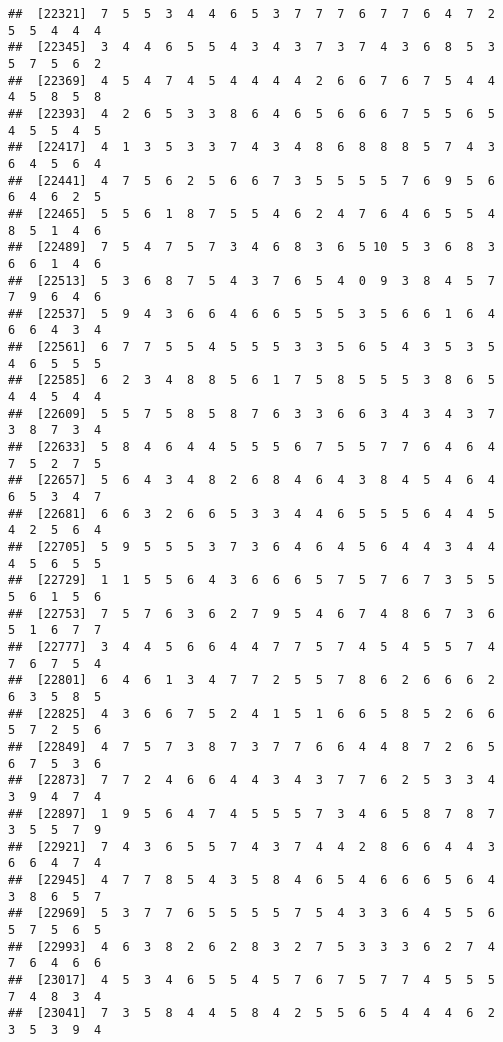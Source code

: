 \documentclass[
]{book}
\begin{document}
\begin{verbatim}
##  [22321]  7  5  5  3  4  4  6  5  3  7  7  7  6  7  7  6  4  7  2  5  5  4  4  4
##  [22345]  3  4  4  6  5  5  4  3  4  3  7  3  7  4  3  6  8  5  3  5  7  5  6  2
##  [22369]  4  5  4  7  4  5  4  4  4  4  2  6  6  7  6  7  5  4  4  4  5  8  5  8
##  [22393]  4  2  6  5  3  3  8  6  4  6  5  6  6  6  7  5  5  6  5  4  5  5  4  5
##  [22417]  4  1  3  5  3  3  7  4  3  4  8  6  8  8  8  5  7  4  3  6  4  5  6  4
##  [22441]  4  7  5  6  2  5  6  6  7  3  5  5  5  5  7  6  9  5  6  6  4  6  2  5
##  [22465]  5  5  6  1  8  7  5  5  4  6  2  4  7  6  4  6  5  5  4  8  5  1  4  6
##  [22489]  7  5  4  7  5  7  3  4  6  8  3  6  5 10  5  3  6  8  3  6  6  1  4  6
##  [22513]  5  3  6  8  7  5  4  3  7  6  5  4  0  9  3  8  4  5  7  7  9  6  4  6
##  [22537]  5  9  4  3  6  6  4  6  6  5  5  5  3  5  6  6  1  6  4  6  6  4  3  4
##  [22561]  6  7  7  5  5  4  5  5  5  3  3  5  6  5  4  3  5  3  5  4  6  5  5  5
##  [22585]  6  2  3  4  8  8  5  6  1  7  5  8  5  5  5  3  8  6  5  4  4  5  4  4
##  [22609]  5  5  7  5  8  5  8  7  6  3  3  6  6  3  4  3  4  3  7  3  8  7  3  4
##  [22633]  5  8  4  6  4  4  5  5  5  6  7  5  5  7  7  6  4  6  4  7  5  2  7  5
##  [22657]  5  6  4  3  4  8  2  6  8  4  6  4  3  8  4  5  4  6  4  6  5  3  4  7
##  [22681]  6  6  3  2  6  6  5  3  3  4  4  6  5  5  5  6  4  4  5  4  2  5  6  4
##  [22705]  5  9  5  5  5  3  7  3  6  4  6  4  5  6  4  4  3  4  4  4  5  6  5  5
##  [22729]  1  1  5  5  6  4  3  6  6  6  5  7  5  7  6  7  3  5  5  5  6  1  5  6
##  [22753]  7  5  7  6  3  6  2  7  9  5  4  6  7  4  8  6  7  3  6  5  1  6  7  7
##  [22777]  3  4  4  5  6  6  4  4  7  7  5  7  4  5  4  5  5  7  4  7  6  7  5  4
##  [22801]  6  4  6  1  3  4  7  7  2  5  5  7  8  6  2  6  6  6  2  6  3  5  8  5
##  [22825]  4  3  6  6  7  5  2  4  1  5  1  6  6  5  8  5  2  6  6  5  7  2  5  6
##  [22849]  4  7  5  7  3  8  7  3  7  7  6  6  4  4  8  7  2  6  5  6  7  5  3  6
##  [22873]  7  7  2  4  6  6  4  4  3  4  3  7  7  6  2  5  3  3  4  3  9  4  7  4
##  [22897]  1  9  5  6  4  7  4  5  5  5  7  3  4  6  5  8  7  8  7  3  5  5  7  9
##  [22921]  7  4  3  6  5  5  7  4  3  7  4  4  2  8  6  6  4  4  3  6  6  4  7  4
##  [22945]  4  7  7  8  5  4  3  5  8  4  6  5  4  6  6  6  5  6  4  3  8  6  5  7
##  [22969]  5  3  7  7  6  5  5  5  5  7  5  4  3  3  6  4  5  5  6  5  7  5  6  5
##  [22993]  4  6  3  8  2  6  2  8  3  2  7  5  3  3  3  6  2  7  4  7  6  4  6  6
##  [23017]  4  5  3  4  6  5  5  4  5  7  6  7  5  7  7  4  5  5  5  7  4  8  3  4
##  [23041]  7  3  5  8  4  4  5  8  4  2  5  5  6  5  4  4  4  6  2  3  5  3  9  4

\end{verbatim}
\end{document}
